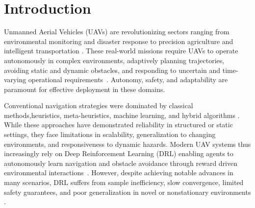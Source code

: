 \documentclass[pdflatex,sn-mathphys-num]{sn-jnl}
\theoremstyle{thmstyleone}%
\theoremstyle{thmstyletwo}%
\theoremstyle{thmstylethree}%
\begin{document}







\maketitle


\section{Introduction}

Unmanned Aerial Vehicles (UAVs) are revolutionizing sectors ranging from environmental monitoring and disaster response to precision agriculture and intelligent transportation \cite{mohsan2023unmanned,mgendi2024unlocking}. These real-world missions require UAVs to operate autonomously in complex environments, adaptively planning trajectories, avoiding static and dynamic obstacles, and responding to uncertain and time-varying operational requirements~\cite{xu2022vision,debnath2024review}. Autonomy, safety, and adaptability are paramount for effective deployment in these domains.

Conventional navigation strategies were dominated by classical methods,heuristics, meta-heuristics, machine learning, and hybrid algorithms \cite{ait2022uav,zhang2024algorithm}. While these approaches have demonstrated reliability in structured or static settings, they face limitations in scalability, generalization to changing environments, and responsiveness to dynamic hazards. Modern UAV systems thus increasingly rely on Deep Reinforcement Learning (DRL) enabling agents to autonomously learn navigation and obstacle avoidance through reward driven environmental interactions~\cite{wang2022vision, fei2024deep}. However, despite achieving notable advances in many scenarios, DRL suffers from sample inefficiency, slow convergence, limited safety guarantees, and poor generalization in novel or nonstationary environments \cite{esrafilian2021model,mohammadhasani2021reinforcement}.
\end{document}
